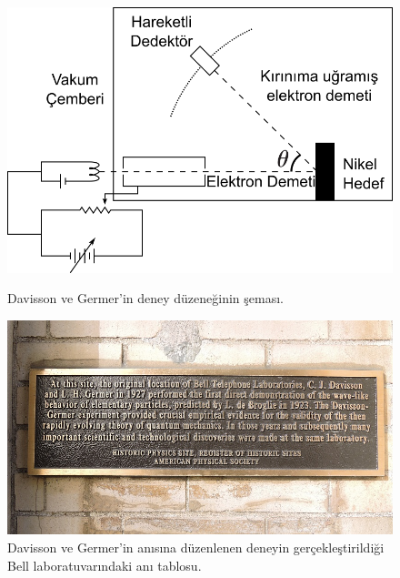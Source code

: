 \documentclass[a4paper,12pt, twoside]{article}
\begin{document}
\begin{figure}[hbtp]
\center
\begin{minipage}{0.45\textwidth}
\includegraphics[scale=.7]{Davisson-Germer_experiment.png}
\caption{Davisson ve Germer'in deney düzeneğinin şeması\cite{web:wiki_davisson_germer1}.}
\label{fig:davisson_germer1}
\end{minipage}
\hspace{24pt}
\begin{minipage}{0.45\textwidth}
\includegraphics[scale=.35]{Bell_Labs_APS_plaque_west_side_of_Westbeth_door_jeh_edited.jpg}
\caption{Davisson ve Germer'in anısına düzenlenen deneyin gerçekleştirildiği Bell laboratuvarındaki anı tablosu\cite{web:wiki_davisson_germer1}.}
\label{fig:davisson_germer2}
\end{minipage}
\end{figure}
\end{document}
